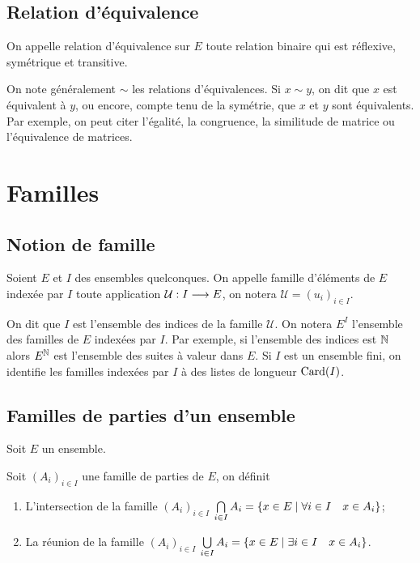 \subsection{Relation d'équivalence}
\label{chap3-subsec:relationequivalence}
\begin{defdef}
    On appelle relation d'équivalence sur \(E\) toute relation binaire qui est 
    réflexive, symétrique et transitive.
\end{defdef}

On note généralement \(\sim\) les relations d'équivalences. Si \(x \sim y\), on 
dit que \(x\) est équivalent à \(y\), ou encore, compte tenu de la symétrie, que 
\(x\) et \(y\) sont équivalents. Par exemple, on peut citer l'égalité, la 
congruence, la similitude de matrice ou l'équivalence de matrices.

\section{Familles}
\label{chap3-sec:familles}

\subsection{Notion de famille}
\label{chap3-subsec:notionfamille}
\begin{defdef}
    Soient \(E\) et \(I\) des ensembles quelconques. On appelle famille 
    d'éléments de \(E\) indexée par \(I\) toute application 
    \(\mathcal{U}:I \longrightarrow E\), on notera \(\mathcal{U} = (u_i)_{i \in 
    I}\).
\end{defdef}

On dit que \(I\) est l'ensemble des indices de la famille \(\mathcal{U}\). On 
notera \(E^I\) l'ensemble des familles de \(E\) indexées par \(I\). Par exemple, 
si l'ensemble des indices est \(\mathbb{N}\) alors \(E^{\mathbb{N}}\) est l'ensemble des suites 
à valeur dans \(E\). Si \(I\) est un ensemble fini, on identifie les familles 
indexées par \(I\) à des listes de longueur \(\operatorname{Card}(I)\).

\subsection{Familles de parties d'un ensemble}
\label{chap3-subsec:familledeparties}

Soit \(E\) un ensemble.
\begin{defdef}
    Soit \((A_i)_{i \in I}\) une famille de parties de \(E\), on définit
    \begin{enumerate}
        \item L'intersection de la famille \((A_i)_{i \in I}\)  
            \(\bigcap\limits_{i \in I} A_i = \left\{x \in E\mathrel{}\middle|\mathrel{}\forall i \in I 
            \quad x \in A_i\right\}\);
        \item La réunion de la famille \((A_i)_{i \in I}\)  \(\bigcup\limits_{i 
            \in I} A_i = \left\{x \in E\mathrel{}\middle|\mathrel{}\exists i \in I \quad x \in A_i\right\}\).
    \end{enumerate}
\end{defdef}

